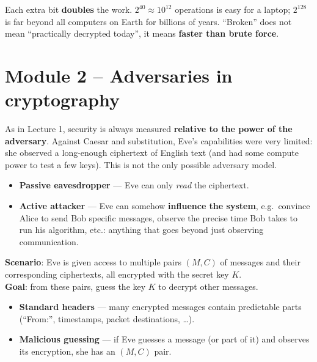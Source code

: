 \begin{rembox}[title=Orders of magnitude]
Each extra bit \textbf{doubles} the work. $2^{40} \approx 10^{12}$ operations is easy for
a laptop; $2^{128}$ is far beyond all computers on Earth for billions of years. ``Broken''
does not mean ``practically decrypted today'', it means \textbf{faster than brute
force}.
\end{rembox}

\section{Module 2 -- Adversaries in cryptography}

\begin{rembox}[title=Back to threat models]
As in Lecture 1, security is always measured \textbf{relative to the power of the
adversary}. Against Caesar and substitution, Eve's capabilities were very limited: she
observed a long-enough ciphertext of English text (and had some compute power to test a
few keys). This is not the only possible adversary model.
\end{rembox}

\begin{defnbox}[title=Types of adversaries]
\begin{itemize}
  \item \textbf{Passive eavesdropper} --- Eve can only \emph{read} the ciphertext.
  \item \textbf{Active attacker} --- Eve can somehow \textbf{influence the system},
        e.g.\ convince Alice to send Bob specific messages, observe the precise time
        Bob takes to run his algorithm, etc.: anything that goes beyond just observing
        communication.
\end{itemize}
\end{defnbox}

\begin{defnbox}[title=Known Plaintext Attack (KPA)]
\textbf{Scenario}: Eve is given access to multiple pairs $(M, C)$ of messages and their
corresponding ciphertexts, all encrypted with the secret key $K$. \\
\textbf{Goal}: from these pairs, guess the key $K$ to decrypt other messages.
\end{defnbox}

\begin{propbox}[title=Why is KPA a realistic model?]
\begin{itemize}
  \item \textbf{Standard headers} --- many encrypted messages contain predictable parts
        (``From:'', timestamps, packet destinations, \ldots).
  \item \textbf{Malicious guessing} --- if Eve guesses a message (or part of it) and
        observes its encryption, she has an $(M, C)$ pair.
\end{itemize}
\end{propbox}

